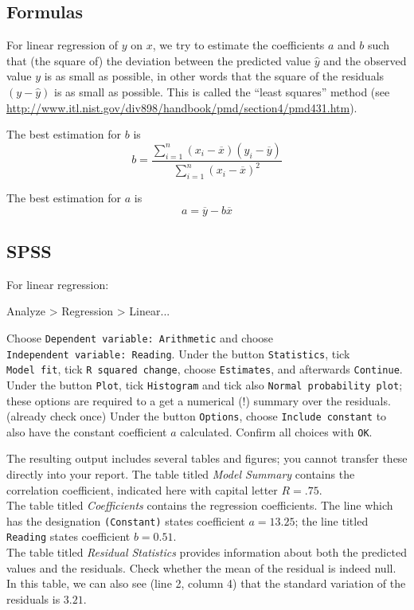 \documentclass[
]{book}
\newenvironment{Shaded}{\begin{snugshade}}{\end{snugshade}}
\newcommand{\NormalTok}[1]{#1}
\begin{document}
\hypertarget{sec:regression-formulas}{%
\subsection{Formulas}\label{sec:regression-formulas}}

For linear regression of \(y\) on \(x\), we try to estimate the coefficients \(a\)
and \(b\) such that (the square of) the deviation between the predicted value \(\hat{y}\)
and the observed value \(y\) is as small as possible, in other words that the
square of the residuals \((y-\hat{y})\) is as small as possible. This is called the
``least squares'' method (see
\url{http://www.itl.nist.gov/div898/handbook/pmd/section4/pmd431.htm}).

The best estimation for \(b\) is
\[b = \frac{ \sum_{i=1}^n (x_i-\overline{x})(y_i-\overline{y}) } { \sum_{i=1}^n (x_i-\overline{x})^2 }\]

The best estimation for \(a\) is \[a = \overline{y} - b \overline{x}\]

\hypertarget{spss-6}{%
\subsection{SPSS}\label{spss-6}}

For linear regression:

\begin{Shaded}
\begin{Highlighting}[]
\NormalTok{Analyze \textgreater{} Regression \textgreater{} Linear...}
\end{Highlighting}
\end{Shaded}

Choose \texttt{Dependent\ variable:\ Arithmetic} and choose
\texttt{Independent\ variable:\ Reading}. Under the button \texttt{Statistics}, tick
\texttt{Model\ fit}, tick \texttt{R\ squared\ change}, choose \texttt{Estimates}, and afterwards
\texttt{Continue}.\\
Under the button \texttt{Plot}, tick \texttt{Histogram} and tick also
\texttt{Normal\ probability\ plot}; these options are required to a get a
numerical (!) summary over the residuals.~
(already check once)
Under the button \texttt{Options}, choose \texttt{Include\ constant} to also have
the constant coefficient \(a\) calculated. Confirm all choices with \texttt{OK}.

The resulting output includes several tables and figures; you cannot
transfer these directly into your report. The table titled \emph{Model
Summary} contains the correlation coefficient, indicated here with capital
letter \(R=.75\).\\
The table titled \emph{Coefficients} contains the regression coefficients. The
line which has the designation \texttt{(Constant)} states coefficient \(a=13.25\);
the line titled \texttt{Reading} states coefficient \(b=0.51\).\\
The table titled \emph{Residual Statistics} provides information about both
the predicted values and the residuals. Check whether the mean of the residual
is indeed null. In this table, we can also see (line 2, column 4) that
the standard variation of the residuals is \(3.21\).
\end{document}
